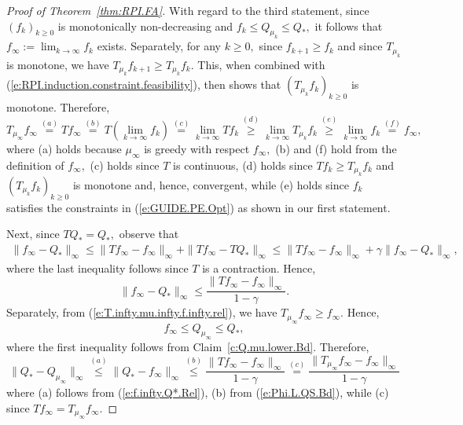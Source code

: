 \documentclass[twoside]{article}
\theoremstyle{plain}
\theoremstyle{definition}
\theoremstyle{remark}
\newcommand{\QS}{Q_*}
\renewcommand{\eqref}[1]{(\ref{#1})}
\begin{document}
\begin{proof}[Proof of Theorem~\ref{thm:RPI.FA}]
With regard to the third statement, since $(f_k)_{k \geq 0}$ is monotonically non-decreasing and $f_k \leq Q_{\mu_k} \leq \QS,$ it follows that $f_{\infty} := \lim_{k \to \infty} f_k$ exists. Separately, for any $k \geq 0,$ since $f_{k + 1} \geq f_k$ and since $T_{\mu_k}$ is monotone, we have $T_{\mu_k} f_{k + 1} \geq T_{\mu_k} f_k.$ This, when combined with \eqref{e:RPI.induction.constraint.feasibility}, then shows that $(T_{\mu_k} f_k)_{k \geq 0}$ is monotone. Therefore, 
%
\begin{equation}
\label{e:T.infty.mu.infty.f.infty.rel}
%
    T_{\mu_\infty} f_{\infty} \overset{(a)}{=} T f_{\infty} \overset{(b)}{=} T(\lim_{k \to \infty} f_k) \overset{(c)}{=} \lim_{k \to \infty} T f_k  \overset{(d)}{\geq } \lim_{k \to \infty} T_{\mu_k} f_k \overset{(e)}{\geq} \lim_{k \to \infty} f_k \overset{(f)}{=} f_{\infty},
\end{equation}
%
where (a) holds because $\mu_\infty$ is greedy with respect $f_{\infty},$ (b) and (f) hold from the definition of $f_{\infty},$ (c) holds since $T$ is continuous,
(d) holds since $Tf_k  \geq T_{\mu_k} f_k$ and $(T_{\mu_k} f_k)_{k \geq 0}$ is monotone and, hence, convergent, while (e) holds since $f_k$ satisfies the constraints in \eqref{e:GUIDE.PE.Opt} as shown in our first statement. 

Next, since $T\QS = \QS,$ observe that
%
\begin{multline*}
    \|f_\infty - \QS\|_\infty \leq \|T f_\infty - f_\infty\|_\infty + \|T f_\infty - T \QS\|_\infty \leq \|T f_\infty - f_\infty\|_\infty + \gamma \|f_\infty -  \QS\|_\infty,
\end{multline*}
%
where the last inequality follows since $T$ is a contraction. Hence,
%
\begin{equation}
\label{e:Phi.L.QS.Bd}
     \|f_\infty - \QS\|_\infty \leq \frac{\|T f_\infty - f_\infty\|_\infty}{1 - \gamma}.
\end{equation}
%
Separately, from \eqref{e:T.infty.mu.infty.f.infty.rel}, we have $T_{\mu_\infty} f_\infty \geq f_\infty.$ Hence, 
%
\begin{equation}
\label{e:f.infty.Q*.Rel}
    f_\infty \leq Q_{\mu_\infty} \leq \QS,
\end{equation}  
%
where the first inequality follows from Claim~\ref{c:Q.mu.lower.Bd}. Therefore, 
%
\[
    \|\QS - Q_{\mu_\infty}\|_\infty \overset{(a)}{\leq} \|\QS - f_\infty \|_\infty \overset{(b)}{\leq} \frac{\|T f_\infty - f_\infty\|_\infty}{1 - \gamma} \overset{(c)}{=} \frac{\|T_{\mu_\infty} f_\infty - f_\infty\|_\infty}{1 - \gamma}
\]
%
where (a) follows from \eqref{e:f.infty.Q*.Rel}, (b) from \eqref{e:Phi.L.QS.Bd}, while (c) since $T f_\infty = T_{\mu_\infty} f_\infty.$


\end{proof}
\end{document}
